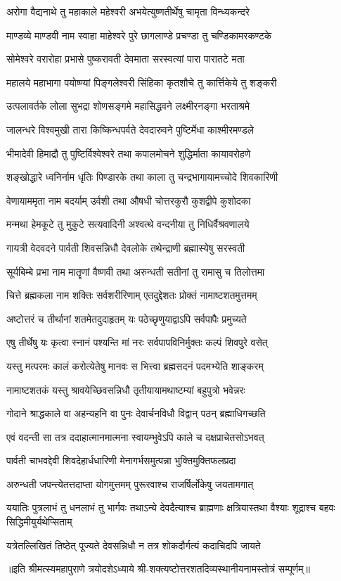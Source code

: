 \twolineshloka
{अरोगा वैद्यनाथे तु महाकाले महेश्वरी}
{अभयेत्युष्णतीर्थेषु चामृता विन्ध्यकन्दरे}

\twolineshloka
{माण्डव्ये माण्डवी नाम स्वाहा माहेश्वरे पुरे}
{छागलाण्डे प्रचण्डा तु चण्डिकामरकण्टके}

\twolineshloka
{सोमेश्वरे वरारोहा प्रभासे पुष्करावती}
{देवमाता सरस्वत्यां पारा पारातटे मता}

\twolineshloka
{महालये महाभागा पयोष्ण्यां पिङ्गलेश्वरी}
{सिंहिका कृतशौचे तु कार्त्तिकेये तु शङ्करी}

\twolineshloka
{उत्पलावर्तके लोला सुभद्रा शोणसङ्गमे}
{महासिद्धवने लक्ष्मीरनङ्गा भरताश्रमे}

\twolineshloka
{जालन्धरे विश्वमुखी तारा किष्किन्धपर्वते}
{देवदारुवने पुष्टिर्मेधा काश्मीरमण्डले}

\twolineshloka
{भीमादेवी हिमाद्रौ तु पुष्टिर्विश्वेश्वरे तथा}
{कपालमोचने शुद्धिर्माता कायावरोहणे}

\twolineshloka
{शङ्खोद्धारे ध्वनिर्नाम धृतिः पिण्डारके तथा}
{काला तु चन्द्रभागायामच्चोदे शिवकारिणी}

\twolineshloka
{वेणायाममृता नाम बदर्याम् उर्वशी तथा}
{औषधी चोत्तरकुरौ कुशद्वीपे कुशोदका}

\twolineshloka
{मन्मथा हेमकूटे तु मुकुटे सत्यवादिनी}
{अश्वत्थे वन्दनीया तु निधिर्वैश्रवणालये}

\twolineshloka
{गायत्री वेदवदने पार्वती शिवसन्निधौ}
{देवलोके तथेन्द्राणी ब्रह्मास्येषु सरस्वती}

\twolineshloka
{सूर्यबिम्बे प्रभा नाम मातॄणां वैष्णवी तथा}
{अरुन्धती सतीनां तु रामासु च तिलोत्तमा}

\twolineshloka
{चित्ते ब्रह्मकला नाम शक्तिः सर्वशरीरिणाम्}
{एतदुद्देशतः प्रोक्तं नामाष्टशतमुत्तमम्}

\twolineshloka
{अष्टोत्तरं च तीर्थानां शतमेतदुदाहृतम्}
{यः पठेच्छृणुयाद्वाऽपि सर्वपापैः प्रमुच्यते}

\twolineshloka
{एषु तीर्थेषु यः कृत्वा स्नानं पश्यन्ति मां नरः}
{सर्वपापविनिर्मुक्तः कल्पं शिवपुरे वसेत्}

\twolineshloka
{यस्तु मत्परमः कालं करोत्येतेषु मानवः}
{स भित्त्वा ब्रह्मसदनं पदमभ्येति शाङ्करम्}

\twolineshloka
{नामाष्टशतकं यस्तु श्रावयेच्छिवसन्निधौ}
{तृतीयायामथाष्टम्यां बहुपुत्रो भवेन्नरः}

\twolineshloka
{गोदाने श्राद्धकाले वा अहन्यहनि वा पुनः}
{देवार्चनविधौ विद्वान् पठन् ब्रह्माधिगच्छति}

\twolineshloka
{एवं वदन्ती सा तत्र ददाहात्मानमात्मना}
{स्वायम्भुवेऽपि काले च दक्षप्राचेतसोऽभवत्}

\twolineshloka
{पार्वती चाभवद्देवी शिवदेहार्धधारिणी}
{मेनागर्भसमुत्पन्ना भुक्तिमुक्तिफलप्रदा}

\twolineshloka
{अरुन्धती जपन्त्येतत्तदाप्ता योगमुत्तमम्}
{पुरूरवाश्च राजर्षिर्लोकेषु जयतामगात्}

\threelineshloka
{ययातिः पुत्रलाभं तु धनलाभं तु भार्गवः}
{तथाऽन्ये देवदैत्याश्च ब्राह्मणाः क्षत्रियास्तथा}
{वैश्याः शूद्राश्च बहवः सिद्धिमीयुर्यथेप्सिताम्}

\twolineshloka
{यत्रेतल्लिखितं तिष्ठेत् पूज्यते देवसन्निधौ}
{न तत्र शोकदौर्गत्यं कदाचिदपि जायते}

॥इति श्रीमत्स्यमहापुराणे त्रयोदशेऽध्याये श्री-शक्त्यष्टोत्तरशतदिव्यस्थानीयनामस्तोत्रं सम्पूर्णम्॥